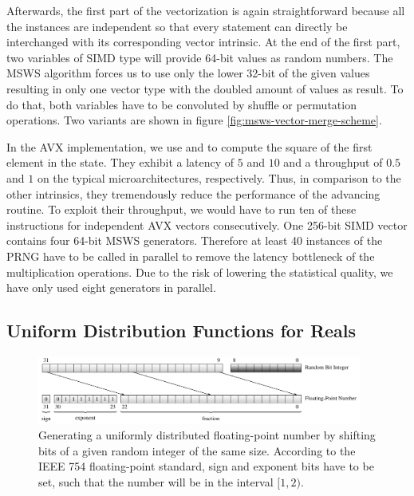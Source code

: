 \documentclass{stdlocal}
\begin{document}
    Afterwards, the first part of the vectorization is again straightforward because all the instances are independent so that every statement can directly be interchanged with its corresponding vector intrinsic.
    At the end of the first part, two variables of SIMD type will provide 64-bit values as random numbers.
    The MSWS algorithm forces us to use only the lower 32-bit of the given values resulting in only one vector type with the doubled amount of values as result.
    To do that, both variables have to be convoluted by shuffle or permutation operations.
    Two variants are shown in figure \ref{fig:msws-vector-merge-scheme}.

    In the AVX implementation, we use  and  to compute the square of the first element in the state.
    They exhibit a latency of $5$ and $10$ and a throughput of $0.5$ and $1$ on the typical microarchitectures, respectively.
    Thus, in comparison to the other intrinsics, they tremendously reduce the performance of the advancing routine.
    To exploit their throughput, we would have to run ten of these instructions for independent AVX vectors consecutively.
    One 256-bit SIMD vector contains four 64-bit MSWS generators.
    Therefore at least 40 instances of the PRNG have to be called in parallel to remove the latency bottleneck of the multiplication operations.
    Due to the risk of lowering the statistical quality, we have only used eight generators in parallel.

  \subsection{Uniform Distribution Functions for Reals} %
  \label{sub:uniform_real_distribution}
    \begin{figure}
      \center
      \includegraphics[width=0.95\textwidth]{figures/uniform_implementation_scheme.pdf}
      \caption[Real Uniform Distribution Function Implementation Scheme]{%
        Generating a uniformly distributed floating-point number by shifting bits of a given random integer of the same size.
        According to the IEEE 754 floating-point standard, sign and exponent bits have to be set, such that the number will be in the interval $[1,2)$.
      }
      \label{fig:real-uniform-implementation-scheme}
    \end{figure}
\end{document}
